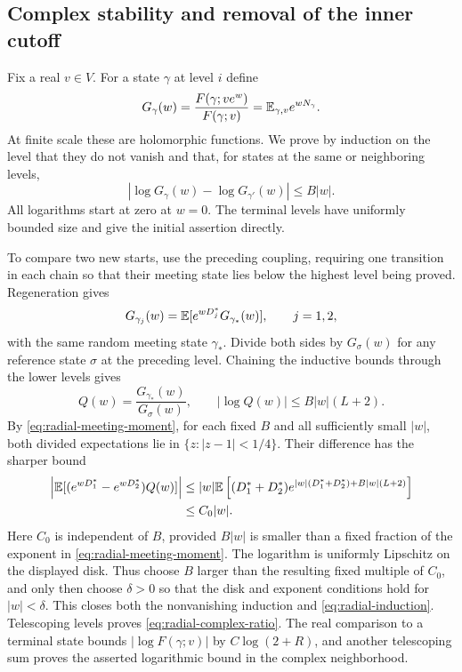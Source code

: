 \subsection{Complex stability and removal of the inner cutoff}

Fix a real $v\in V$. For a state $\gamma$ at level $i$ define
\[
 G_\gamma(w)
     =\frac{F(\gamma;ve^w)}{F(\gamma;v)}
     =\mathbb E_{\gamma,v}e^{wN_\gamma}.
\]
At finite scale these are holomorphic functions. We prove by induction
on the level that they do not vanish and that, for states at the same
or neighboring levels,
\begin{equation}\label{eq:radial-induction}
 |\log G_\gamma(w)-\log G_{\gamma'}(w)|\le B|w|.
\end{equation}
All logarithms start at zero at $w=0$. The terminal levels have
uniformly bounded size and give the initial assertion directly.

To compare two new starts, use the preceding coupling, requiring one
transition in each chain so that their meeting state lies below the
highest level being proved. Regeneration gives
\[
 G_{\gamma_j}(w)=
        \mathbb E[e^{wD_j^*}G_{\gamma_*}(w)],\qquad j=1,2,
\]
with the same random meeting state $\gamma_*$. Divide both sides by
$G_\sigma(w)$ for any reference state $\sigma$ at the preceding
level. Chaining the inductive bounds through the lower levels gives
\[
 Q(w)=\frac{G_{\gamma_*}(w)}{G_\sigma(w)},\qquad
 |\log Q(w)|\le B|w|(L+2).
\]
By \eqref{eq:radial-meeting-moment}, for each fixed $B$ and all
sufficiently small $|w|$, both divided expectations lie in
$\{z:|z-1|<1/4\}$. Their difference has the sharper bound
\begin{align*}
 \left|\mathbb E[(e^{wD_1^*}-e^{wD_2^*})Q(w)]\right|
 &\le |w|\mathbb E\left[(D_1^*+D_2^*)
   e^{|w|(D_1^*+D_2^*)+B|w|(L+2)}\right]\\
 &\le C_0|w|.
\end{align*}
Here $C_0$ is independent of $B$, provided $B|w|$ is smaller than
a fixed fraction of the exponent in
\eqref{eq:radial-meeting-moment}. The logarithm is uniformly
Lipschitz on the displayed disk. Thus choose $B$ larger than the
resulting fixed multiple of $C_0$, and only then choose $\delta>0$
so that the disk and exponent conditions hold for $|w|<\delta$.
This closes both the nonvanishing induction and
\eqref{eq:radial-induction}. Telescoping levels proves
\eqref{eq:radial-complex-ratio}. The real comparison to a terminal
state bounds $|\log F(\gamma;v)|$ by $C\log(2+R)$, and another
telescoping sum proves the asserted logarithmic bound in the complex
neighborhood.


